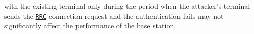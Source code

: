 \documentclass[english]{article}
\begin{document}
with the existing terminal only during the period when the attacker's terminal sends the \texttt{\hyperlink{RRC}{RRC}}
connection request and the authentication fails may not significantly affect the performance
of the base station.\\[0.2cm]
\end{document}
